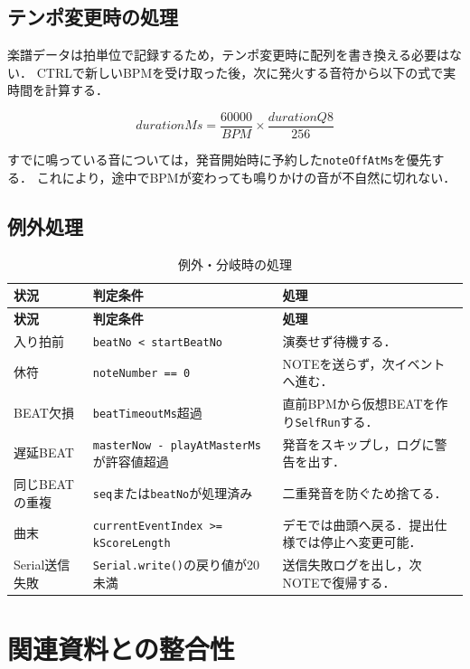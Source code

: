 \documentclass[uplatex,dvipdfmx]{jlreq}
\newcommand{\code}[1]{\texttt{#1}}
\begin{document}
\subsection{テンポ変更時の処理}

楽譜データは拍単位で記録するため，テンポ変更時に配列を書き換える必要はない．
CTRLで新しいBPMを受け取った後，次に発火する音符から以下の式で実時間を計算する．

\[
durationMs = \frac{60000}{BPM} \times \frac{durationQ8}{256}
\]

すでに鳴っている音については，発音開始時に予約した\code{noteOffAtMs}を優先する．
これにより，途中でBPMが変わっても鳴りかけの音が不自然に切れない．

\subsection{例外処理}

\begin{longtable}{p{}p{}p{}}
\caption{例外・分岐時の処理}\label{tab:exceptions}\\
\toprule
\textbf{状況} & \textbf{判定条件} & \textbf{処理} \\
\midrule
\endfirsthead
\toprule
\textbf{状況} & \textbf{判定条件} & \textbf{処理} \\
\midrule
\endhead
入り拍前 & \code{beatNo < startBeatNo} & 演奏せず待機する．\\
休符 & \code{noteNumber == 0} & NOTEを送らず，次イベントへ進む．\\
BEAT欠損 & \code{beatTimeoutMs}超過 & 直前BPMから仮想BEATを作り\code{SelfRun}する．\\
遅延BEAT & \code{masterNow - playAtMasterMs}が許容値超過 & 発音をスキップし，ログに警告を出す．\\
同じBEATの重複 & \code{seq}または\code{beatNo}が処理済み & 二重発音を防ぐため捨てる．\\
曲末 & \code{currentEventIndex >= kScoreLength} & デモでは曲頭へ戻る．提出仕様では停止へ変更可能．\\
Serial送信失敗 & \code{Serial.write()}の戻り値が20未満 & 送信失敗ログを出し，次NOTEで復帰する．\\
\bottomrule
\end{longtable}

\section{関連資料との整合性}
\end{document}

